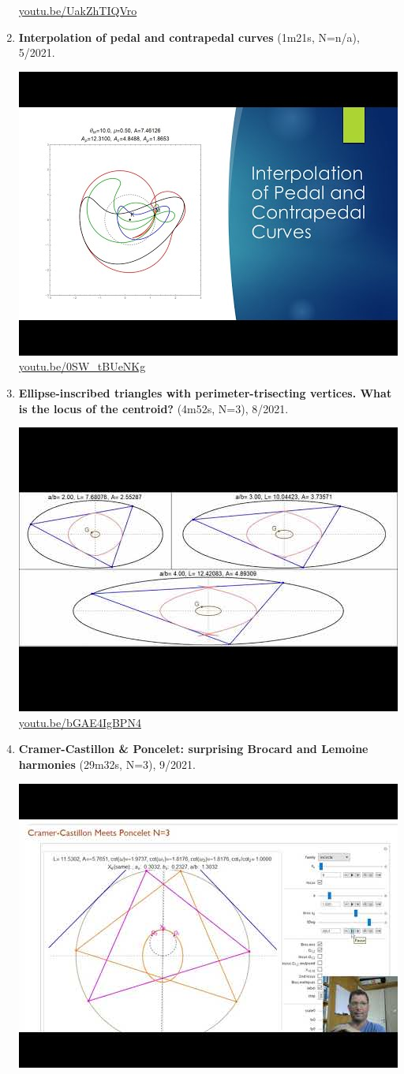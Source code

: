 \documentclass[12pt]{amsart}
\begin{document}
\begin{enumerate}[resume]
\begin{center}
\href{https://youtu.be/UakZhTIQVro}{\url{youtu.be/UakZhTIQVro}}\end{center}
% 
\item \textbf{Interpolation of pedal and contrapedal curves} (1m21s, N=n/a), 5/2021. 
\begin{center}\includegraphics[width=.5\textwidth]{pics/0SW_tBUeNKg.jpg} \\ 
\href{https://youtu.be/0SW_tBUeNKg}{\url{youtu.be/0SW\_tBUeNKg}}\end{center}
% 
\item \textbf{Ellipse-inscribed triangles with perimeter-trisecting vertices. What is the locus of the centroid?} (4m52s, N=3), 8/2021. 
\begin{center}\includegraphics[width=.5\textwidth]{pics/bGAE4IgBPN4.jpg} \\ 
\href{https://youtu.be/bGAE4IgBPN4}{\url{youtu.be/bGAE4IgBPN4}}\end{center}
% 
\item \textbf{Cramer-Castillon \& Poncelet: surprising Brocard and Lemoine harmonies} (29m32s, N=3), 9/2021. 
\begin{center}\includegraphics[width=.5\textwidth]{pics/Aw4U2Ah1Byc.jpg} \\ 

\end{center}
\end{enumerate}
\end{document}
